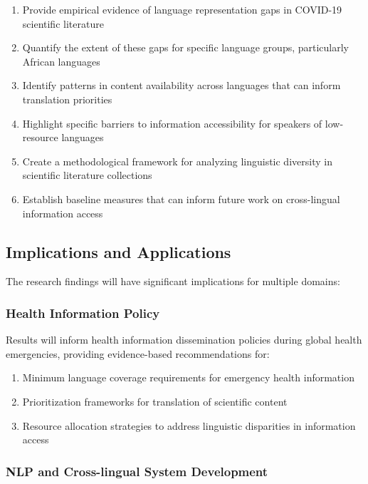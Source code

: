 \documentclass[
]{article}
\providecommand{\tightlist}{%
  \setlength{\itemsep}{0pt}\setlength{\parskip}{0pt}}\usepackage{longtable,booktabs,array}
\begin{document}
\begin{enumerate}
\def\labelenumi{\arabic{enumi}.}
\tightlist
\item
  Provide empirical evidence of language representation gaps in COVID-19
  scientific literature
\item
  Quantify the extent of these gaps for specific language groups,
  particularly African languages
\item
  Identify patterns in content availability across languages that can
  inform translation priorities
\item
  Highlight specific barriers to information accessibility for speakers
  of low-resource languages
\item
  Create a methodological framework for analyzing linguistic diversity
  in scientific literature collections
\item
  Establish baseline measures that can inform future work on
  cross-lingual information access
\end{enumerate}

\subsection{Implications and
Applications}\label{implications-and-applications}

The research findings will have significant implications for multiple
domains:

\subsubsection{Health Information
Policy}\label{health-information-policy}

Results will inform health information dissemination policies during
global health emergencies, providing evidence-based recommendations for:

\begin{enumerate}
\def\labelenumi{\arabic{enumi}.}
\tightlist
\item
  Minimum language coverage requirements for emergency health
  information
\item
  Prioritization frameworks for translation of scientific content
\item
  Resource allocation strategies to address linguistic disparities in
  information access
\end{enumerate}

\subsubsection{NLP and Cross-lingual System
Development}\label{nlp-and-cross-lingual-system-development}
\end{document}
